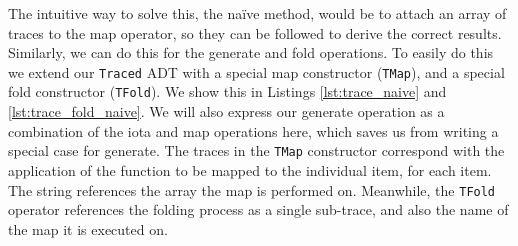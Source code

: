         The intuitive way to solve this, the naïve method, would be to attach an array of traces to the map operator, so they can be followed to derive the correct results.
        Similarly, we can do this for the generate and fold operations.
        To easily do this we extend our \texttt{Traced} ADT with a special map constructor (\texttt{TMap}), and a special fold constructor (\texttt{TFold}).
        We show this in Listings \ref{lst:trace_naive} and \ref{lst:trace_fold_naive}.
        We will also express our generate operation as a combination of the iota and map operations here, which saves us from writing a special case for generate.
        The traces in the \texttt{TMap} constructor correspond with the application of the function to be mapped to the individual item, for each item.
        The string references the array the map is performed on.
        Meanwhile, the \texttt{TFold} operator references the folding process as a single sub-trace, and also the name of the map it is executed on.

